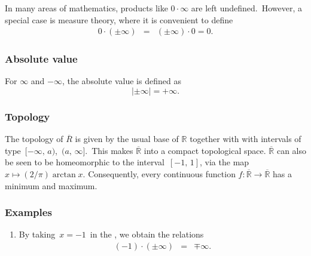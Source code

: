 \documentclass[12pt]{article}
\newcommand{\sR}[0]{\mathbb{R}}
\begin{document}
In many areas of mathematics, products like $0\cdot \infty$
are left undefined.\, However, a special case is 
measure theory, where it is convenient to define
\begin{eqnarray*}
0\cdot (\pm \infty) &=& (\pm \infty) \cdot 0 = 0.
\end{eqnarray*}

\subsubsection{Absolute value}
For $\infty$ and $-\infty$, the absolute value is defined as
$$
  |\pm \infty| = +\infty.
$$

\subsubsection{Topology}
The topology of $\overline{R}$ is given by the usual base of $\sR$
together with with intervals of type\, $[-\infty,\,a)$,\, $(a,\,\infty]$.\, 
This makes $\overline{\sR}$ into a compact topological space.
$\overline{\sR}$ can also be seen to be homeomorphic to the interval\, $[-1,\,1]$, via 
the map $x \mapsto (2/\pi) \arctan x$.
Consequently, every 
continuous function $f\colon \overline{\sR}\to \overline{\sR}$ has
a minimum and maximum. 

\subsubsection{Examples}
\begin{enumerate}
\item By taking\, $x = -1$\, in the , we obtain
the relations
\begin{eqnarray*}
(-1)\cdot (\pm\infty) &=& \mp \infty.
\end{eqnarray*}
\end{enumerate}
\end{document}
